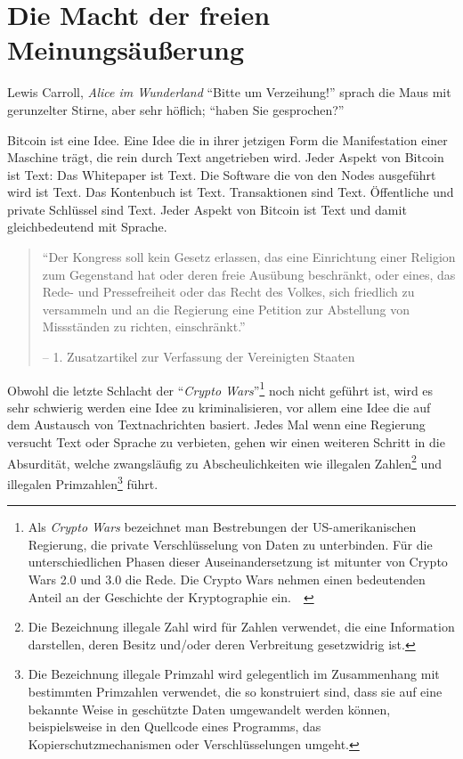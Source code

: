 \chapter{Die Macht der freien Meinungsäußerung}
\label{les:6}

\begin{chapquote}{Lewis Carroll, \textit{Alice im Wunderland}}
\enquote{Bitte um Verzeihung!} sprach die Maus mit gerunzelter Stirne,
aber sehr höflich; \enquote{haben Sie gesprochen?}
\end{chapquote}

Bitcoin ist eine Idee. Eine Idee die in ihrer jetzigen Form die Manifestation
einer Maschine trägt, die rein durch Text angetrieben wird. Jeder Aspekt von
Bitcoin ist Text: Das Whitepaper ist Text. Die Software die von den Nodes
ausgeführt wird ist Text. Das Kontenbuch ist Text. Transaktionen sind Text.
Öffentliche und private Schlüssel sind Text. Jeder Aspekt von Bitcoin ist Text
und damit gleichbedeutend mit Sprache.

\begin{quotation}\begin{samepage}
\enquote{Der Kongress soll kein Gesetz erlassen, das eine Einrichtung einer
Religion zum Gegenstand hat oder deren freie Ausübung beschränkt, oder eines,
das Rede- und Pressefreiheit oder das Recht des Volkes, sich friedlich zu
versammeln und an die Regierung eine Petition zur Abstellung von Missständen zu
richten, einschränkt.}
\begin{flushright} -- 1. Zusatzartikel zur Verfassung der Vereinigten Staaten
\end{flushright}\end{samepage}\end{quotation}

Obwohl die letzte Schlacht der \enquote{\textit{Crypto Wars}}\footnote{Als \textit{Crypto
Wars} bezeichnet man Bestrebungen der US-amerikanischen Regierung, die private
Verschlüsselung von Daten zu unterbinden. Für die unterschiedlichen Phasen
dieser Auseinandersetzung ist mitunter von Crypto Wars 2.0 und 3.0 die Rede. Die
Crypto Wars nehmen einen bedeutenden Anteil an der Geschichte der Kryptographie
ein.~\cite{eff-cryptowars}~\cite{wiki:cryptowars}} noch nicht geführt ist, wird
es sehr schwierig werden eine Idee zu kriminalisieren, vor allem eine Idee die
auf dem Austausch von Textnachrichten basiert. Jedes Mal wenn eine Regierung
versucht Text oder Sprache zu verbieten, gehen wir einen weiteren Schritt in die
Absurdität, welche zwangsläufig zu Abscheulichkeiten wie illegalen
Zahlen\footnote{Die Bezeichnung illegale Zahl wird für Zahlen verwendet, die
eine Information darstellen, deren Besitz und/oder deren Verbreitung
gesetzwidrig ist.\cite{wiki:illegal-number}} und illegalen
Primzahlen\footnote{Die Bezeichnung illegale Primzahl wird gelegentlich im
Zusammenhang mit bestimmten Primzahlen verwendet, die so konstruiert sind, dass
sie auf eine bekannte Weise in geschützte Daten umgewandelt werden können,
beispielsweise in den Quellcode eines Programms, das Kopierschutzmechanismen
oder Verschlüsselungen umgeht.\cite{wiki:illegal-prime}} führt.

